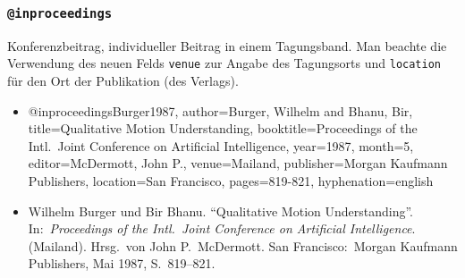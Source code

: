 
\subsubsection{\texttt{@inproceedings}}
\label{sec:@inproceedings}
Konferenzbeitrag, individueller Beitrag in einem Tagungsband.
Man beachte die Verwendung des neuen Felds \texttt{venue}
zur Angabe des Tagungsorts und 
\texttt{location} für den Ort der Publikation (des Verlags).

\begin{itemize}
\item[]
\begin{GenericCode}[numbers=none]
@inproceedings{Burger1987,
	author={Burger, Wilhelm and Bhanu, Bir},
	title={Qualitative Motion Understanding},
	booktitle={Proceedings of the Intl.\ Joint Conference on Artificial Intelligence},
	year={1987},
	month={5},
	editor={McDermott, John P.},
	venue={Mailand},
	publisher={Morgan Kaufmann Publishers},
	location={San Francisco},
	pages={819-821},
	hyphenation={english}
}
\end{GenericCode}
\item[\cite{Burger1987}]
Wilhelm Burger und Bir Bhanu. "`Qualitative Motion Understanding"'.
In:\ \textit{Proceedings of the Intl.\ Joint Conference on Artificial Intelligence}.
(Mailand). Hrsg.\ von John P.\ McDermott. San Francisco:\ Morgan
Kaufmann Publishers, Mai 1987, S.\ 819--821.
\end{itemize}


